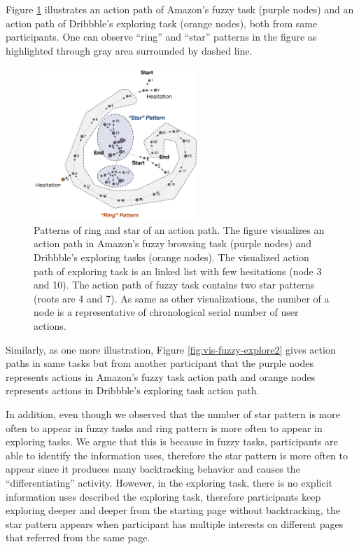 Figure \ref{fig:vis-fuzzy-explore1} illustrates an action path of Amazon's fuzzy task (purple nodes)
and an action path of Dribbble's exploring task (orange nodes), both from same participants.
One can observe ``ring'' and ``star'' patterns in the figure as highlighted through 
gray area surrounded by dashed line.

\begin{figure}[H]
    \centering
    \includegraphics[width=0.55\textwidth]{figures/vis-patterns1}
    \caption{Patterns of ring and star of an action path. The figure visualizes an action path in
    Amazon's fuzzy browsing task (purple nodes) and Dribbble's exploring tasks (orange nodes). 
    The visualized action path of exploring task is an linked list with few hesitations (node 3 and 10).
    The action path of fuzzy task contains two star patterns (roots are 4 and 7).
    As same as other visualizations, the number of a node
    is a representative of chronological serial number of user actions.}
    \label{fig:vis-fuzzy-explore1}
\end{figure}

Similarly, as one more illustration, Figure \ref{fig:vis-fuzzy-explore2} gives action paths 
in same tasks but from another participant that the purple nodes represents actions in Amazon's fuzzy task action path
and orange nodes represents actions in Dribbble's exploring task action path.

In addition, even though we observed that the number of star pattern is more often to appear
in fuzzy tasks and ring pattern is more often to appear in exploring tasks.
We argue that this is because in fuzzy tasks, participants are able to identify the
information uses, therefore the star pattern is more often to appear since it produces many backtracking
behavior and causes the ``differentiating'' activity. However, in the exploring task,
there is no explicit information uses described the exploring task, therefore participants
keep exploring deeper and deeper from the starting page without backtracking, the star pattern
appears when participant has multiple interests on different pages that referred from the same page.

